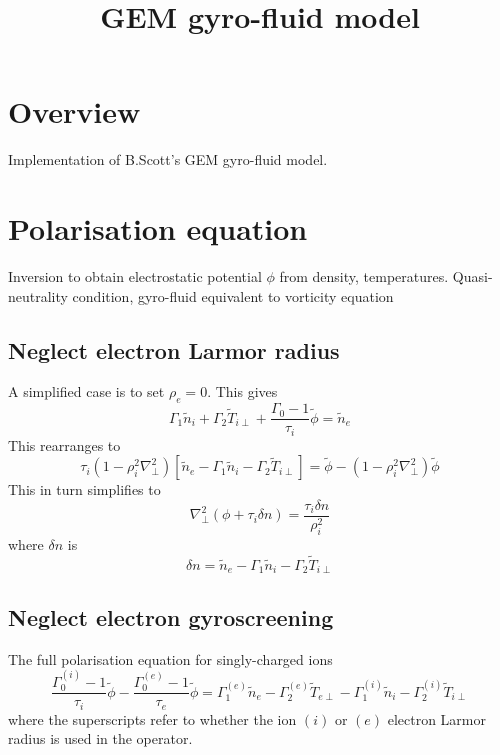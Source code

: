 \documentclass[12pt]{article}
\begin{document}
\title{GEM gyro-fluid model}

\maketitle

\section{Overview}

Implementation of B.Scott's GEM gyro-fluid model.


\section{Polarisation equation}

Inversion to obtain electrostatic potential $\phi$ from density, temperatures.
Quasi-neutrality condition, gyro-fluid equivalent to vorticity equation

\subsection{Neglect electron Larmor radius}

A simplified case is to set $\rho_e = 0$. This gives
\[
\Gamma_1 \tilde{n}_i + \Gamma_2\tilde{T}_{i\perp} + \frac{\Gamma_0 - 1}{\tau_i}\tilde{\phi} = \tilde{n}_e
\]
This rearranges to
\[
\tau_i\left(1-\rho_i^2\nabla_\perp^2\right)\left[\tilde{n}_e - \Gamma_1\tilde{n}_i - \Gamma_2\tilde{T}_{i\perp}\right] = \tilde{\phi} - \left(1-\rho_i^2\nabla_\perp^2\right)\tilde{\phi}
\]
This in turn simplifies to
\begin{equation}
\nabla_\perp^2\left(\phi + \tau_i\delta n\right) = \frac{\tau_i\delta n}{\rho_i^2}
\end{equation}
where $\delta n$ is
\[
\delta n = \tilde{n}_e - \Gamma_1\tilde{n}_i - \Gamma_2\tilde{T}_{i\perp}
\]

\subsection{Neglect electron gyroscreening}

The full polarisation equation for singly-charged ions
\[
\frac{\Gamma^{\left(i\right)}_0 - 1}{\tau_i}\tilde{\phi} - \frac{\Gamma_0^{\left(e\right)} - 1}{\tau_e}\tilde{\phi} = \Gamma_1^{\left(e\right)}\tilde{n}_e - \Gamma_2^{\left(e\right)}\tilde{T}_{e\perp} - \Gamma_1^{\left(i\right)}\tilde{n}_i - \Gamma_2^{\left(i\right)}\tilde{T}_{i\perp}
\]
where the superscripts refer to whether the ion $\left(i\right)$ or $\left(e\right)$ electron Larmor radius is used in the operator.
\end{document}
